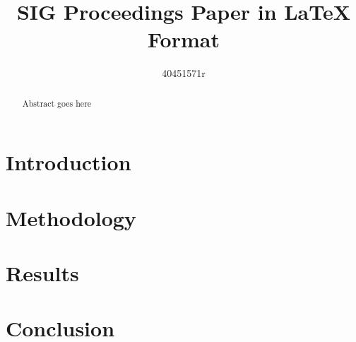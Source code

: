 \documentclass[sigconf]{acmart}
\begin{document}
\title{SIG Proceedings Paper in LaTeX Format}

\author{40451571r}



\begin{abstract}
Abstract goes here
\end{abstract}





\maketitle

\section{Introduction}
\section{Methodology}
\section{Results}
\section{Conclusion}

%
 
\end{document}
